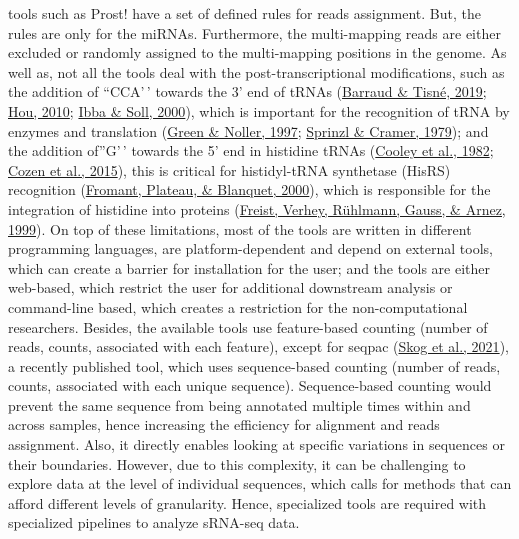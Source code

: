 \documentclass[12pt,twoside]{reedthesis}
\begin{document}
tools such as Prost! have a set of defined rules for reads assignment.
But, the rules are only for the miRNAs. Furthermore, the multi-mapping
reads are either excluded or randomly assigned to the multi-mapping
positions in the genome. As well as, not all the tools deal with the
post-transcriptional modifications, such as the addition of ``CCA'\,'
towards the 3' end of tRNAs (\protect\hyperlink{ref-barraud2019}{Barraud \& Tisné, 2019}; \protect\hyperlink{ref-hou2010}{Hou, 2010}; \protect\hyperlink{ref-ibba2000}{Ibba \& Soll, 2000}), which
is important for the recognition of tRNA by enzymes and translation
(\protect\hyperlink{ref-green1997}{Green \& Noller, 1997}; \protect\hyperlink{ref-sprinzl1979}{Sprinzl \& Cramer, 1979}); and the addition of''G'\,' towards the 5' end
in histidine tRNAs (\protect\hyperlink{ref-cooley1982}{Cooley et al., 1982}; \protect\hyperlink{ref-cozen2015}{Cozen et al., 2015}), this is critical for
histidyl-tRNA synthetase (HisRS) recognition (\protect\hyperlink{ref-fromant2000}{Fromant, Plateau, \& Blanquet, 2000}), which is
responsible for the integration of histidine into proteins
(\protect\hyperlink{ref-freist1999}{Freist, Verhey, Rühlmann, Gauss, \& Arnez, 1999}). On top of these limitations, most of the tools are
written in different programming languages, are platform-dependent and
depend on external tools, which can create a barrier for installation
for the user; and the tools are either web-based, which restrict the
user for additional downstream analysis or command-line based, which
creates a restriction for the non-computational researchers. Besides,
the available tools use feature-based counting (number of reads, counts,
associated with each feature), except for seqpac (\protect\hyperlink{ref-skog2021}{Skog et al., 2021}), a recently
published tool, which uses sequence-based counting (number of reads,
counts, associated with each unique sequence). Sequence-based counting
would prevent the same sequence from being annotated multiple times
within and across samples, hence increasing the efficiency for alignment
and reads assignment. Also, it directly enables looking at specific
variations in sequences or their boundaries. However, due to this
complexity, it can be challenging to explore data at the level of
individual sequences, which calls for methods that can afford different
levels of granularity. Hence, specialized tools are required with
specialized pipelines to analyze sRNA-seq data.
\end{document}
